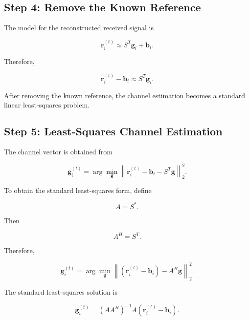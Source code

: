 \documentclass[12pt,a4paper]{article}
\begin{document}
\subsection{Step 4: Remove the Known Reference}

The model for the reconstructed received signal is

\begin{equation}
\mathbf r_i^{(t)}
\approx
S^T\mathbf g_i+\mathbf b_i.
\tag{309}
\end{equation}

Therefore,

\begin{equation}
\boxed{
\mathbf r_i^{(t)}-\mathbf b_i
\approx
S^T\mathbf g_i
}.
\tag{310}
\end{equation}

After removing the known reference, the channel estimation becomes a standard linear least-squares problem.

\subsection{Step 5: Least-Squares Channel Estimation}

The channel vector is obtained from

\begin{equation}
\boxed{
\mathbf g_i^{(t)}
=
\arg\min_{\mathbf g}
\left\|
\mathbf r_i^{(t)}
-
\mathbf b_i
-
S^T\mathbf g
\right\|_2^2
}.
\tag{311}
\end{equation}

To obtain the standard least-squares form, define

\begin{equation}
A=S^*.
\tag{312}
\end{equation}

Then

\begin{equation}
A^H=S^T.
\tag{313}
\end{equation}

Therefore,

\begin{equation}
\mathbf g_i^{(t)}
=
\arg\min_{\mathbf g}
\left\|
(\mathbf r_i^{(t)}-\mathbf b_i)
-
A^H\mathbf g
\right\|_2^2.
\tag{314}
\end{equation}

The standard least-squares solution is

\begin{equation}
\boxed{
\mathbf g_i^{(t)}
=
(AA^H)^{-1}
A
\left(
\mathbf r_i^{(t)}-\mathbf b_i
\right)
}.
\tag{315}
\end{equation}
\end{document}
